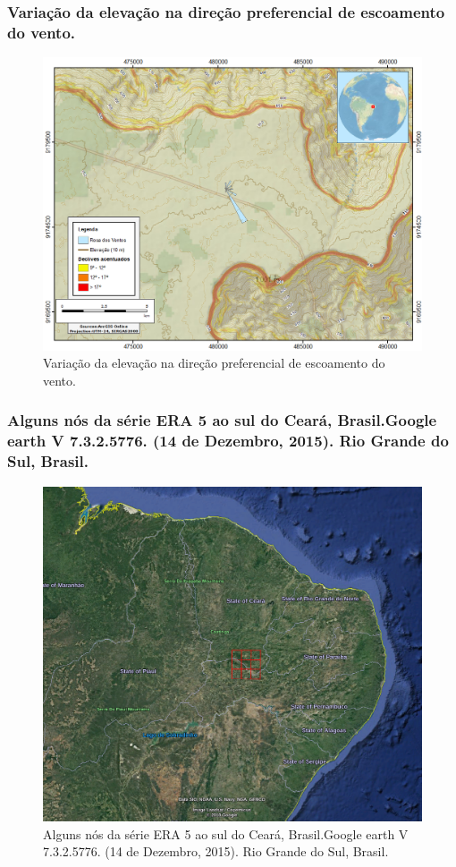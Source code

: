 \documentclass{beamer}
\begin{document}
\begin{frame}
	\frametitle{Variação da elevação na direção preferencial de escoamento do vento.}
	\begin{figure}
		\centering
		\includegraphics[width=\textwidth]{arcmap}
		\caption{Variação da elevação na direção preferencial de escoamento do vento.}
	\end{figure}
\end{frame}

\begin{frame}
	\frametitle{Alguns nós da série ERA 5 ao sul do Ceará, Brasil.\newline Google earth V 7.3.2.5776. (14 de Dezembro, 2015). Rio Grande do Sul, Brasil.}
	\begin{figure}
		\centering
		\includegraphics[width=\textwidth]{era5nodes}
		\caption{Alguns nós da série ERA 5 ao sul do Ceará, Brasil.\newline Google earth V 7.3.2.5776. (14 de Dezembro, 2015). Rio Grande do Sul, Brasil.}
	\end{figure}
\end{frame}
\end{document}

